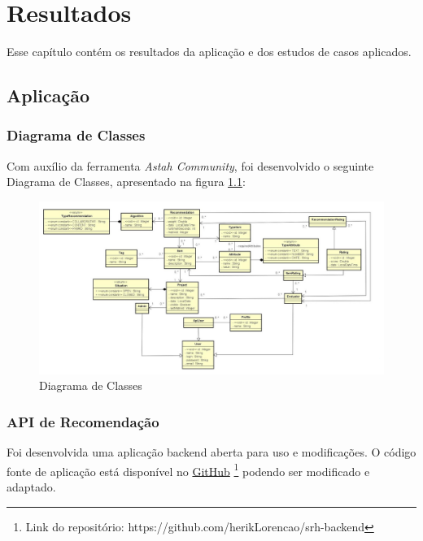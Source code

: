 

\setlength{\afterchapskip}{1.5cm minus \baselineskip}


\chapter{Resultados}
\label{cha:resultados}

Esse capítulo contém os resultados da aplicação e dos estudos de casos aplicados.

\section{Aplicação}

\subsection{Diagrama de Classes}

Com auxílio da ferramenta \textit{Astah Community}, foi desenvolvido o seguinte Diagrama de Classes, apresentado na figura \ref{fig:diagramaClasses}:

\begin{figure}[H]
	\centering
	\includegraphics[width=1\linewidth]{imagens/diagramaClasses.PNG}
	\caption[Diagrama de Classes]{Diagrama de Classes}
    \label{fig:diagramaClasses}
\end{figure}

\subsection{API de Recomendação}

Foi desenvolvida uma aplicação backend aberta para uso e modificações. O código fonte de aplicação está disponível no \href{https://github.com/herikLorencao/srh-backend}{GitHub} \footnote{Link do repositório: https://github.com/herikLorencao/srh-backend} podendo ser modificado e adaptado.

